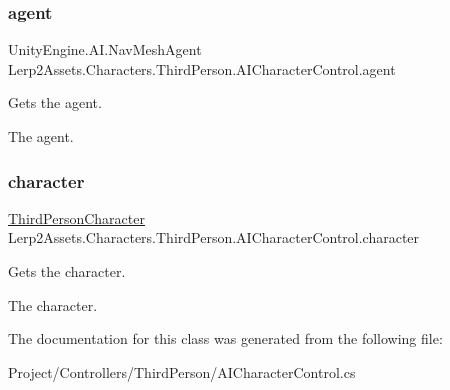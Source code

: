 \subsubsection{\texorpdfstring{agent}{agent}}
{\footnotesize\ttfamily Unity\+Engine.\+A\+I.\+Nav\+Mesh\+Agent Lerp2\+Assets.\+Characters.\+Third\+Person.\+A\+I\+Character\+Control.\+agent\hspace{0.3cm}{\ttfamily [get]}}



Gets the agent. 

The agent.\mbox{\label{class_lerp2_assets_1_1_characters_1_1_third_person_1_1_a_i_character_control_a7a5d9019472849a7c4432a701506fc92}} 
\subsubsection{\texorpdfstring{character}{character}}
{\footnotesize\ttfamily \hyperlink{class_lerp2_assets_1_1_characters_1_1_third_person_1_1_third_person_character}{Third\+Person\+Character} Lerp2\+Assets.\+Characters.\+Third\+Person.\+A\+I\+Character\+Control.\+character\hspace{0.3cm}{\ttfamily [get]}}



Gets the character. 

The character.

The documentation for this class was generated from the following file\+:\begin{DoxyCompactItemize}
\item 
Project/\+Controllers/\+Third\+Person/A\+I\+Character\+Control.\+cs\end{DoxyCompactItemize}
